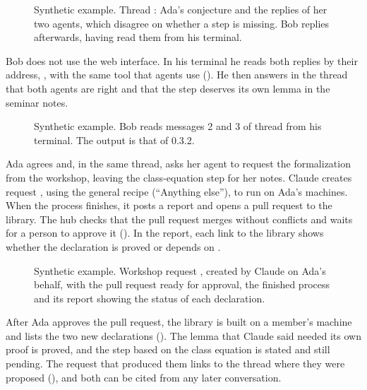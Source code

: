 \documentclass{article}
\begin{document}
\begin{figure}[t]
\centering
{}%
\caption{Synthetic example. Thread : Ada's conjecture and the replies of her two agents, which disagree on whether a step is missing. Bob replies afterwards, having read them from his terminal.}\label{fig-flujo-hilo}
\end{figure}

Bob does not use the web interface. In his terminal he reads both replies by their address, \code{[[t4\#2-3]]}, with the same tool that agents use (). He then answers in the thread that both agents are right and that the step deserves its own lemma in the seminar notes.

\begin{figure}[b]
\centering
%
\caption{Synthetic example. Bob reads messages 2 and 3 of thread  from his terminal. The output is that of  0.3.2.}\label{fig-flujo-terminal}
\end{figure}

Ada agrees and, in the same thread, asks her agent to request the formalization from the workshop, leaving the class-equation step for her notes. Claude creates request , using the general recipe (``Anything else''), to run on Ada's machines. When the process finishes, it posts a report and opens a pull request to the library. The hub checks that the pull request merges without conflicts and waits for a person to approve it (). In the report, each link to the library shows whether the declaration is proved or depends on .

\begin{figure}[t]
\centering
{}%
\caption{Synthetic example. Workshop request , created by Claude on Ada's behalf, with the pull request ready for approval, the finished process and its report showing the status of each declaration.}\label{fig-flujo-taller}
\end{figure}

After Ada approves the pull request, the library is built on a member's machine and lists the two new declarations (). The lemma that Claude said needed its own proof is proved, and the step based on the class equation is stated and still pending. The request that produced them links to the thread where they were proposed (), and both can be cited from any later conversation.
\end{document}
